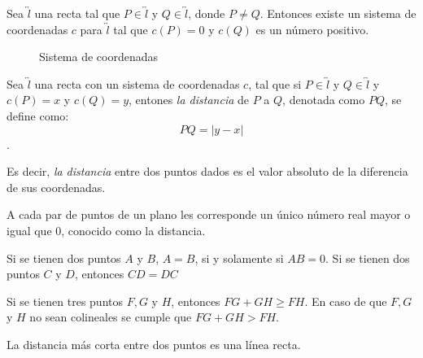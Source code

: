 \clearpage

\begin{postulate}

    Sea $\overleftrightarrow{l}$ una recta tal que $P \in \overleftrightarrow{l}$ y  $Q \in \overleftrightarrow{l}$, donde $P \neq Q$. Entonces existe un sistema de coordenadas $c$ para $\overleftrightarrow{l}$ tal que $c(P)=0$ y $c(Q)$ es un número positivo.

    \begin{figure}[!h]
        \centering
        
        \caption{Sistema de coordenadas}
        \label{fig:plot4}
    \end{figure}

\end{postulate}

\begin{definition}
    Sea $\overleftrightarrow{l}$ una recta con un sistema de coordenadas $c$, tal que si $P \in \overleftrightarrow{l}$ y $Q \in \overleftrightarrow{l}$ y $c(P) = x$ y $c(Q) = y$, entones \textit{la distancia} de $P$ a $Q$, denotada como $PQ$, se define como: $$PQ = |y - x|$$.

    Es decir, \textit{la distancia} entre dos puntos dados es el valor absoluto de la diferencia de sus coordenadas.
\end{definition}

\begin{postulate}
A cada par de puntos de un plano les corresponde un único número real mayor o igual que 0, conocido como la distancia.
\end{postulate}

\begin{postulate}
Si se tienen dos puntos $A$ y $B$, $A = B$, si y solamente si $AB = 0$.
Si se tienen dos puntos $C$ y $D$, entonces $CD = DC$
\end{postulate}

\begin{theorem}
    Si se tienen tres puntos $F,G$ y $H$, entonces $FG + GH \ge FH$. En caso de que $F,G$ y $H$ no sean colineales se cumple que $FG + GH > FH$.

    \begin{corolary}
    La distancia más corta entre dos puntos es una línea recta.
    \end{corolary}
    
\end{theorem}


